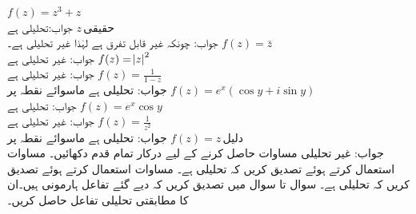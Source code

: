 \quad
$f(z)=z^3+z$\\
جواب:\quad تحلیلی ہے
\quad
$z\,\text{حقیقی}$\\
جواب:\quad
چونکہ غیر قابل تفرق ہے لہٰذا غیر تحلیلی ہے۔
\quad
$f(z)=\bar{z}$\\
جواب:\quad
غیر تحلیلی ہے
\quad
$f(z)=\abs{z}^2$\\
جواب:\quad
غیر تحلیلی ہے
\quad
$f(z)=\tfrac{1}{1-z}$\\
جواب:\quad
تحلیلی ہے ماسوائے نقطہ  پر
\quad
$f(z)=e^x(\cos y+i\sin y)$\\
جواب:\quad
تحلیلی ہے
\quad
$f(z)=e^x\cos y$\\
جواب:\quad
غیر تحلیلی ہے
\quad
$f(z)=\tfrac{1}{z^2}$\\
جواب:\quad
تحلیلی ہے ماسوائے نقطہ  پر
\quad
$f(z)=z\,\text{دلیل}$\\
جواب:\quad
غیر تحلیلی
\quad
مساوات  حاصل کرنے کے لیے درکار تمام قدم دکھائیں۔
\quad
مساوات  استعمال کرتے ہوئے تصدیق کریں کہ  تحلیلی ہے۔
\quad
مساوات  استعمال کرتے ہوئے تصدیق کریں کہ  تحلیلی ہے۔
سوال  تا سوال  میں تصدیق کریں کہ دیے گئے تفاعل ہارمونی ہیں۔ان کا مطابقتی تحلیلی تفاعل  حاصل کریں۔

